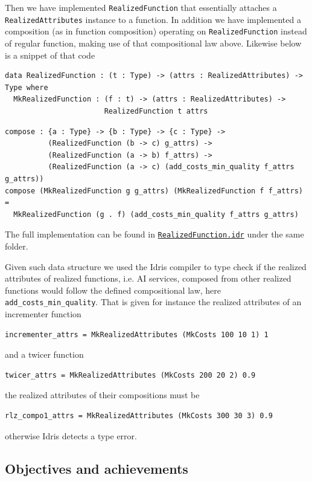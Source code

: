 \documentclass[]{report}
\begin{document}
Then we have implemented \texttt{RealizedFunction} that essentially
attaches a \texttt{RealizedAttributes} instance to a function.  In
addition we have implemented a composition (as in function
composition) operating on \texttt{RealizedFunction} instead of
regular function, making use of that compositional law above.
Likewise below is a snippet of that code

\begin{verbatim}
data RealizedFunction : (t : Type) -> (attrs : RealizedAttributes) -> Type where
  MkRealizedFunction : (f : t) -> (attrs : RealizedAttributes) ->
                       RealizedFunction t attrs
\end{verbatim}

\begin{verbatim}
compose : {a : Type} -> {b : Type} -> {c : Type} ->
          (RealizedFunction (b -> c) g_attrs) ->
          (RealizedFunction (a -> b) f_attrs) ->
          (RealizedFunction (a -> c) (add_costs_min_quality f_attrs g_attrs))
compose (MkRealizedFunction g g_attrs) (MkRealizedFunction f f_attrs) =
  MkRealizedFunction (g . f) (add_costs_min_quality f_attrs g_attrs)
\end{verbatim}
The full implementation can be found in
\href{https://github.com/singnet/ai-dsl/blob/master/experimental/realized-function/RealizedFunction.idr}{\texttt{RealizedFunction.idr}}
under the same folder.

Given such data structure we used the Idris compiler to type check if
the realized attributes of realized functions, i.e. AI services,
composed from other realized functions would follow the defined
compositional law, here \texttt{add\_costs\_min\_quality}.  That is given
for instance the realized attributes of an incrementer function
\begin{verbatim}
incrementer_attrs = MkRealizedAttributes (MkCosts 100 10 1) 1
\end{verbatim}
and a twicer function
\begin{verbatim}
twicer_attrs = MkRealizedAttributes (MkCosts 200 20 2) 0.9
\end{verbatim}
the realized attributes of their compositions must be
\begin{verbatim}
rlz_compo1_attrs = MkRealizedAttributes (MkCosts 300 30 3) 0.9
\end{verbatim}
otherwise Idris detects a type error.

\subsection{Objectives and achievements}
\end{document}
